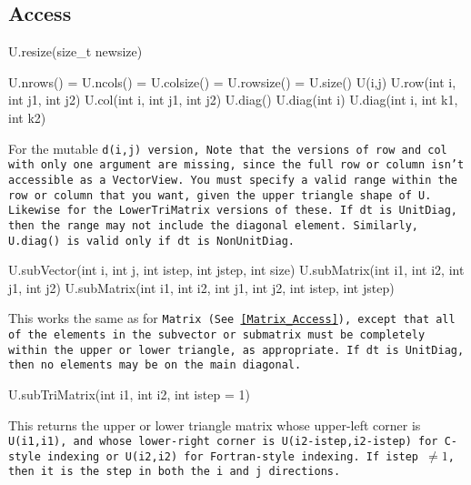 \subsection{Access}
\label{TriMatrix_Access}

\begin{tmvcode}
U.resize(size_t newsize)
\end{tmvcode}

\begin{tmvcode}
U.nrows() = U.ncols() = U.colsize() = U.rowsize() = U.size()
U(i,j)
U.row(int i, int j1, int j2)
U.col(int i, int j1, int j2)
U.diag()
U.diag(int i)
U.diag(int i, int k1, int k2)
\end{tmvcode}
For the mutable \tt{d(i,j)} version, 
Note that the versions of \tt{row} and \tt{col} with only one argument are
missing, since the full row or column isn't accessible as a \tt{VectorView}.
You must specify a valid range within the row or column that you want, 
given the upper triangle shape of \tt{U}.  Likewise for the \tt{LowerTriMatrix}
versions of these.
If \tt{dt} is \tt{UnitDiag}, then the range may not include the diagonal element.
Similarly, \tt{U.diag()} is valid only if \tt{dt} is \tt{NonUnitDiag}.

\begin{tmvcode}
U.subVector(int i, int j, int istep, int jstep, int size)
U.subMatrix(int i1, int i2, int j1, int j2)
U.subMatrix(int i1, int i2, int j1, int j2, int istep, int jstep)
\end{tmvcode}
This works the same as for \tt{Matrix}
(See \ref{Matrix_Access}),
except that all of the elements in the 
subvector or submatrix must be completely within the upper or lower triangle, as
appropriate.  If \tt{dt} is \tt{UnitDiag}, then no elements may be on the 
main diagonal.

\begin{tmvcode}
U.subTriMatrix(int i1, int i2, int istep = 1)
\end{tmvcode}
This returns the upper or lower triangle matrix whose upper-left
corner is \tt{U(i1,i1)}, and whose lower-right corner is 
\tt{U(i2-istep,i2-istep)} for C-style indexing or \tt{U(i2,i2)} 
for Fortran-style indexing.  If \tt{istep} $\neq 1$, then it is the 
step in both the \tt{i} and \tt{j} directions.


